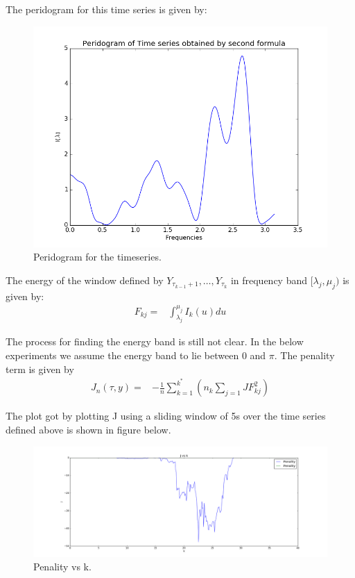 \documentclass{article}
\begin{document}
The peridogram for this time series is given by:
\begin{figure}[ht!]
  \centering
  \includegraphics[width=1\textwidth]{images/changepoint_sd/peri2}
  \caption{Peridogram for the timeseries.\label{fig:cp_sd_peri2}}
\end{figure}

The energy of the window defined by $Y_{\tau_{k-1}+1}, \ldots, Y_{\tau_{k}}$ in frequency band $[\lambda_{j}, \mu_{j})$ is given by:
\begin{align}
  F_{kj} =& \int_{\lambda_{j}}^{\mu_{j}} I_{k}(u)du
\end{align}


The process for finding the energy band is still not clear.  In the below experiments we assume the energy band to lie between 0 and $\pi$.
The penality term is given by
\begin{align*}
  J_{n}(\tau, y) =& -\frac{1}{n} \sum_{k=1}^{k^{*}} (n_{k} \sum_{j=1}{J}F_{kj}^{2})
\end{align*}

The plot got by plotting J using a sliding window of 5s over the time series defined above is shown in figure below.
\begin{figure}[ht!]
  \centering
  \includegraphics[width=1\textwidth]{images/changepoint_sd/penality}
  \caption{Penality vs k.\label{fig:cp_sd_penality}}
\end{figure}
\end{document}
